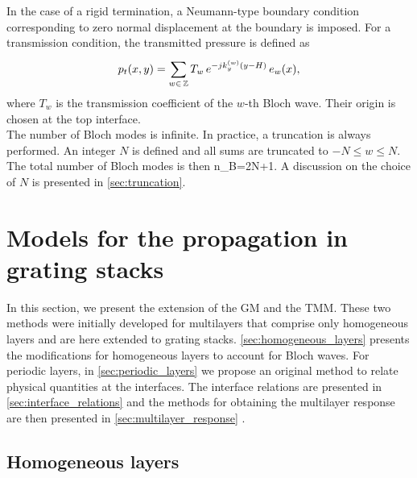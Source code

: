 In the case of a rigid termination, a Neumann-type boundary condition corresponding to zero normal displacement at the boundary is imposed. For a transmission condition, the transmitted pressure is defined as 
\begin{equation}\label{eq:p_t as T}
  p_t(x,y) = \displaystyle{\sum_{w\in \, \mathbb{Z}}^{}}\,  T_w \,e^{-jk_y^{(w)} (y-H)}\,{e}_{w}(x), 
\end{equation}
where $T_w$ is the transmission coefficient of the $w$-th Bloch wave. Their origin is chosen at the top interface. \\

The number of Bloch modes is infinite. In practice, a truncation is always performed. An integer $N$ is defined and all sums  are truncated to $-N\leqslant w \leqslant N$.  The total number of Bloch modes is then 
\be
n_B=2N+1.
\ee 
A discussion on the choice of $N$ is presented in \cref{sec:truncation}.

\section{Models for the propagation in grating stacks}

In this section, we present the extension of the GM and the TMM. These two methods were initially developed for multilayers that comprise only homogeneous layers and are here extended to grating stacks. \cref{sec:homogeneous_layers} presents the modifications for homogeneous layers to account for Bloch waves. For periodic layers, in \cref{sec:periodic_layers} we propose an original method to relate physical quantities at the interfaces. The interface relations are presented in \cref{sec:interface_relations} and the methods for obtaining the multilayer response are then presented in \cref{sec:multilayer_response}
.\\


\subsection{Homogeneous layers\label{sec:homogeneous_layers}}

